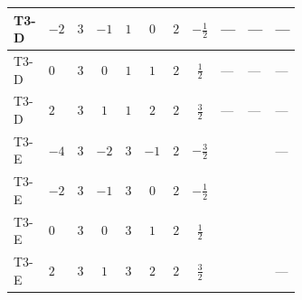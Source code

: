 \documentclass[8pt]{article}
\begin{document}
\begin{landscape}
\begin{longtable}{@{}llcccccc >{\raggedright\arraybackslash}p{0.21\linewidth} >{\raggedright\arraybackslash}p{0.21\linewidth} >{\raggedright\arraybackslash}p{0.21\linewidth}@{}}
\midrule
T3-D & $-2$ & $3$ & $-1$ & $1$ & $0$ & $2$ & $-\frac{1}{2}$ & --- & --- & --- \\
\midrule
T3-D & $0$ & $3$ & $0$ & $1$ & $1$ & $2$ & $\frac{1}{2}$ & --- & --- & --- \\
\midrule
T3-D & $2$ & $3$ & $1$ & $1$ & $2$ & $2$ & $\frac{3}{2}$ & --- & --- & --- \\
\midrule
T3-E & $-4$ & $3$ & $-2$ & $3$ & $-1$ & $2$ & $-\frac{3}{2}$ & \scriptsize\adjustbox{max width=\linewidth}{$\begin{gathered} +16 {\lambda_{12}^{(A)}} {\lambda_{S_2}^{(A)}}\end{gathered}$} & \scriptsize\adjustbox{max width=\linewidth}{$\begin{gathered} +3 {\lambda_{HS_1}^{(A)}} {\lambda_{HS_2}^{(A)}}\end{gathered}$} & --- \\
\midrule
T3-E & $-2$ & $3$ & $-1$ & $3$ & $0$ & $2$ & $-\frac{1}{2}$ & \scriptsize\adjustbox{max width=\linewidth}{$\begin{gathered} +16 {\lambda_{12}^{(A)}} {\lambda_{S_2}^{(A)}}\end{gathered}$} & \scriptsize\adjustbox{max width=\linewidth}{$\begin{gathered} +3 {\lambda_{HS_1}^{(A)}} {\lambda_{HS_2}^{(A)}}\end{gathered}$} & \scriptsize\adjustbox{max width=\linewidth}{$\begin{gathered} -6 {g_1}^2 {\lambda_{12}^{(A)}}\end{gathered}$} \\
\midrule
T3-E & $0$ & $3$ & $0$ & $3$ & $1$ & $2$ & $\frac{1}{2}$ & \scriptsize\adjustbox{max width=\linewidth}{$\begin{gathered} +16 {\lambda_{12}^{(A)}} {\lambda_{S_2}^{(A)}}\end{gathered}$} & \scriptsize\adjustbox{max width=\linewidth}{$\begin{gathered} +3 {\lambda_{HS_1}^{(A)}} {\lambda_{HS_2}^{(A)}}\end{gathered}$} & \scriptsize\adjustbox{max width=\linewidth}{$\begin{gathered} -6 {g_1}^2 {\lambda_{12}^{(A)}}\end{gathered}$} \\
\midrule
T3-E & $2$ & $3$ & $1$ & $3$ & $2$ & $2$ & $\frac{3}{2}$ & \scriptsize\adjustbox{max width=\linewidth}{$\begin{gathered} +16 {\lambda_{12}^{(A)}} {\lambda_{S_2}^{(A)}}\end{gathered}$} & \scriptsize\adjustbox{max width=\linewidth}{$\begin{gathered} +3 {\lambda_{HS_1}^{(A)}} {\lambda_{HS_2}^{(A)}}\end{gathered}$} & --- \\
\midrule
\bottomrule
\end{longtable}
\clearpage

\end{landscape}
\end{document}
